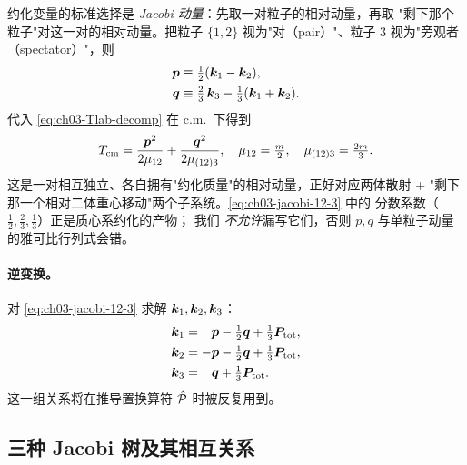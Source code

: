 约化变量的标准选择是 \emph{Jacobi 动量}：先取一对粒子的相对动量，再取
"剩下那个粒子"对这一对的相对动量。把粒子 \(\{1, 2\}\) 视为"对（pair）"、粒子
3 视为"旁观者（spectator）"，则
\begin{align}
\label{eq:ch03-jacobi-12-3}
\bm{p} &\equiv \tfrac{1}{2}(\bm{k}_1 - \bm{k}_2),
\nonumber\\
\bm{q} &\equiv \tfrac{2}{3}\,\bm{k}_3 - \tfrac{1}{3}(\bm{k}_1 + \bm{k}_2).
\end{align}
代入 \cref{eq:ch03-Tlab-decomp} 在 c.m.\ 下得到
\begin{equation}
\label{eq:ch03-Tcm-jacobi}
T_{\rm cm}
= \frac{\bm{p}^2}{2\mu_{12}} + \frac{\bm{q}^2}{2\mu_{(12)3}},
\quad
\mu_{12} = \tfrac{m}{2},
\quad
\mu_{(12)3} = \tfrac{2m}{3}.
\end{equation}
这是一对相互独立、各自拥有"约化质量"的相对动量，正好对应两体散射 +
"剩下那一个相对二体重心移动"两个子系统。\cref{eq:ch03-jacobi-12-3} 中的
分数系数（\(\tfrac{1}{2}, \tfrac{2}{3}, \tfrac{1}{3}\)）正是质心系约化的产物；
我们 \emph{不允许}漏写它们，否则 \(p, q\) 与单粒子动量的雅可比行列式会错。

\paragraph{逆变换。}
对 \cref{eq:ch03-jacobi-12-3} 求解 \(\bm{k}_1, \bm{k}_2, \bm{k}_3\)：
\begin{align}
\label{eq:ch03-k-from-pq}
\bm{k}_1 &= \phantom{-}\bm{p} - \tfrac{1}{2}\bm{q} + \tfrac{1}{3}\bm{P}_{\rm tot},
\nonumber\\
\bm{k}_2 &= -\bm{p} - \tfrac{1}{2}\bm{q} + \tfrac{1}{3}\bm{P}_{\rm tot},
\nonumber\\
\bm{k}_3 &= \phantom{-}\bm{q} + \tfrac{1}{3}\bm{P}_{\rm tot}.
\end{align}
这一组关系将在推导置换算符 \(\hat{\mathcal{P}}\) 时被反复用到。

\subsection{三种 Jacobi 树及其相互关系}
\label{subsec:ch03-three-trees}

